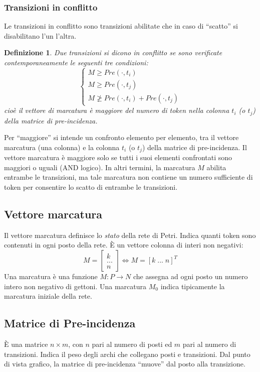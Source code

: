 \documentclass[a4paper]{report}
\newtheorem{definizione}{Definizione}
\begin{document}
\subsubsection{Transizioni in conflitto}
Le transizioni in conflitto sono transizioni abilitate che in caso di
``scatto'' si disabilitano l'un l'altra.
\begin{definizione}
 Due transizioni si dicono in conflitto se sono verificate
 contemporaneamente le seguenti tre condizioni: 
 \[
 \left \{
 \begin{array}{l}
   M \geq Pre(\cdot, t_i)\\
   M \geq Pre(\cdot, t_j)\\
   M \ngeq Pre(\cdot, t_i) + Pre(\cdot, t_j)
 \end{array}
 \right .
 \]
cio\`e il vettore di marcatura \`e maggiore del numero di token nella
colonna $t_i$ (o $t_j$) della matrice di pre-incidenza.
\end{definizione}
Per ``maggiore'' si intende un confronto elemento per
elemento, tra il vettore marcatura (una colonna) e la colonna $t_i$ (o
$t_j$) della matrice di pre-incidenza. Il vettore
marcatura \`e maggiore solo se tutti i suoi elementi confrontati sono
maggiori o uguali (AND logico). In altri termini, la marcatura $M$
abilita entrambe le transizioni, ma tale marcatura non contiene un
numero sufficiente di token per consentire lo scatto di entrambe le
transizioni. 

\subsection{Vettore marcatura}\label{vettoreDiMarcatura} 
Il vettore marcatura definisce lo {\em stato} della rete di
Petri. Indica quanti token sono contenuti in ogni posto della
rete. \`E un vettore colonna di interi non negativi:
\[
M = 
 \begin{bmatrix}
  k\\
  ...\\
  n
 \end{bmatrix}
 \Leftrightarrow
 M = [ k \; ... \; n]^T
\]
Una marcatura \`e una funzione $M : P \rightarrow N$ che assegna ad
ogni posto un numero intero non negativo di gettoni. Una marcatura
$M_0$ indica tipicamente la marcatura iniziale della rete. 

\subsection{Matrice di Pre-incidenza}\label{matricePreincidenza}
\`E una matrice $n \times m$, con $n$ pari al numero di posti ed $m$
pari al numero di transizioni. Indica il peso degli archi che
collegano posti e transizioni. Dal punto di vista grafico, la matrice
di pre-incidenza ``muove'' dal posto alla transizione.
\end{document}

